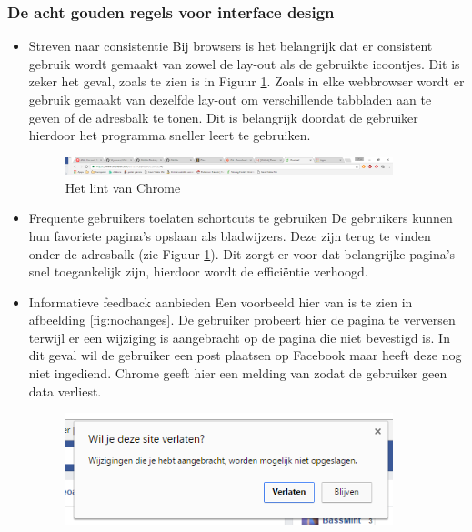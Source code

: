 \documentclass[12pt]{article}
\begin{document}
\subsubsection{De acht gouden regels voor interface design}
\begin{itemize}
\item Streven naar consistentie
\newline
Bij browsers is het belangrijk dat er consistent gebruik wordt gemaakt van zowel de lay-out als de gebruikte icoontjes. Dit is zeker het geval, zoals te zien is in Figuur \ref{fig:tabsChrome}. Zoals in elke webbrowser wordt er gebruik gemaakt van dezelfde lay-out om verschillende tabbladen aan te geven of de adresbalk te tonen. Dit is belangrijk doordat de gebruiker hierdoor het programma sneller leert te gebruiken.
\begin{figure}
  \centering
    \includegraphics[width=0.9\textwidth]{Tabs_Chrome.png}
  \caption{Het lint van Chrome}
  \label{fig:tabsChrome}
\end{figure}
\item Frequente gebruikers toelaten schortcuts te gebruiken
\newline
De gebruikers kunnen hun favoriete pagina's opslaan als bladwijzers. Deze zijn terug te vinden onder de adresbalk (zie Figuur \ref{fig:tabsChrome}). Dit zorgt er voor dat belangrijke pagina's snel toegankelijk zijn, hierdoor wordt de effici\"entie verhoogd.
\item Informatieve feedback aanbieden
\newline
Een voorbeeld hier van is te zien in afbeelding \ref{fig:nochanges}. De gebruiker probeert hier de pagina te verversen terwijl er een wijziging is aangebracht op de pagina die niet bevestigd is. In dit geval wil de gebruiker een post plaatsen op Facebook maar heeft deze nog niet ingediend. Chrome geeft hier een melding van zodat de gebruiker geen data verliest.
\begin{figure}
  \centering
    \includegraphics[width=0.9\textwidth]{No_Changes.png}

\end{figure}
\end{itemize}
\end{document}

